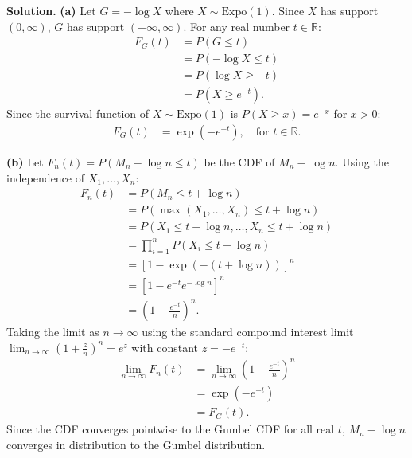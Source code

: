 \documentclass[11pt,a4paper]{article}
\begin{document}
\noindent \textbf{Solution.} \textbf{(a)} Let $G = -\log X$ where $X \sim \text{Expo}(1)$. Since $X$ has support $(0, \infty)$, $G$ has support $(-\infty, \infty)$. For any real number $t \in \mathbb{R}$:
\begin{align*}
F_G(t) &= P(G \le t) \\
&= P(-\log X \le t) \\
&= P(\log X \ge -t) \\
&= P\left(X \ge e^{-t}\right).
\end{align*}
Since the survival function of $X \sim \text{Expo}(1)$ is $P(X \ge x) = e^{-x}$ for $x > 0$:
\begin{align*}
F_G(t) &= \exp\left( -e^{-t} \right), \quad \text{for } t \in \mathbb{R}.
\end{align*}

\vspace{4pt}
\noindent \textbf{(b)} Let $F_n(t) = P(M_n - \log n \le t)$ be the CDF of $M_n - \log n$. Using the independence of $X_1, \dots, X_n$:
\begin{align*}
F_n(t) &= P(M_n \le t + \log n) \\
&= P\left(\max(X_1, \dots, X_n) \le t + \log n\right) \\
&= P(X_1 \le t + \log n, \dots, X_n \le t + \log n) \\
&= \prod_{i=1}^{n} P(X_i \le t + \log n) \\
&= \left[ 1 - \exp\left( -(t + \log n) \right) \right]^n \\
&= \left[ 1 - e^{-t} e^{-\log n} \right]^n \\
&= \left( 1 - \frac{e^{-t}}{n} \right)^n.
\end{align*}
Taking the limit as $n \to \infty$ using the standard compound interest limit $\lim_{n \to \infty} \left(1 + \frac{z}{n}\right)^n = e^z$ with constant $z = -e^{-t}$:
\begin{align*}
\lim_{n \to \infty} F_n(t) &= \lim_{n \to \infty} \left( 1 - \frac{e^{-t}}{n} \right)^n \\
&= \exp\left( -e^{-t} \right) \\
&= F_G(t).
\end{align*}
Since the CDF converges pointwise to the Gumbel CDF for all real $t$, $M_n - \log n$ converges in distribution to the Gumbel distribution.

\vspace{10pt}
\end{document}
